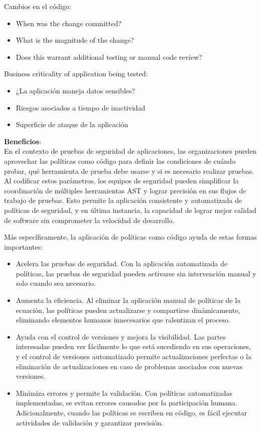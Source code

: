 \documentclass[12pt]{book}
\begin{document}
Cambios en el código:
\begin{itemize}
    \item When was the change committed? 
    \item What is the magnitude of the change? 
    \item Does this warrant additional testing or manual code review?
\end{itemize}

Business criticality of application being tested:
\begin{itemize}
    \item ¿La aplicación maneja datos sensibles?
    \item Riesgos asociados a tiempo de inactividad
    \item Superficie de ataque de la aplicación
\end{itemize}

\textbf{Beneficios}:\\

En el contexto de pruebas de seguridad de aplicaciones, las organizaciones pueden aprovechar las políticas como código para definir las condiciones de cuándo probar, qué herramienta de prueba debe usarse y si es necesario realizar pruebas. Al codificar estos parámetros, los equipos de seguridad pueden simplificar la coordinación de múltiples herramientas AST y lograr precisión en sus flujos de trabajo de pruebas. Esto permite la aplicación consistente y automatizada de políticas de seguridad, y en última instancia, la capacidad de lograr mejor calidad de software sin comprometer la velocidad de desarrollo.

Más específicamente, la aplicación de políticas como código ayuda de estas formas importantes:
\begin{itemize}
    \item Acelera las pruebas de seguridad. Con la aplicación automatizada de políticas, las pruebas de seguridad pueden activarse sin intervención manual y solo cuando sea necesario.
    \item Aumenta la eficiencia. Al eliminar la aplicación manual de políticas de la ecuación, las políticas pueden actualizarse y compartirse dinámicamente, eliminando elementos humanos innecesarios que ralentizan el proceso.
    \item Ayuda con el control de versiones y mejora la visibilidad. Las partes interesadas pueden ver fácilmente lo que está sucediendo en sus operaciones, y el control de versiones automatizado permite actualizaciones perfectas o la eliminación de actualizaciones en caso de problemas asociados con nuevas versiones.
    \item Minimiza errores y permite la validación. Con políticas automatizadas implementadas, se evitan errores causados por la participación humana. Adicionalmente, cuando las políticas se escriben en código, es fácil ejecutar actividades de validación y garantizar precisión.
\end{itemize}
\end{document}
